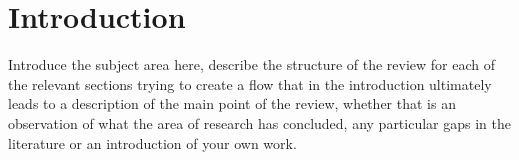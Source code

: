 \documentclass[../main.tex]{subfiles}
\begin{document}
\section{Introduction}

Introduce the subject area here, describe the structure of the review for each of the relevant sections trying to create a flow that in the introduction ultimately leads to a description of the main point of the review, whether that is an observation of what the area of research has concluded, any particular gaps in the literature or an introduction of your own work.
\end{document}
